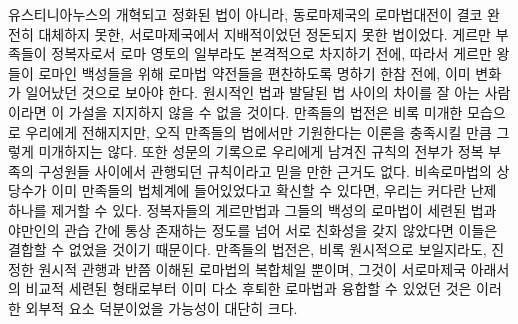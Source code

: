 유스티니아누스의 개혁되고 정화된 법이 아니라,
동로마제국의 로마법대전이 결코 완전히 대체하지 못한,
서로마제국에서 지배적이었던
정돈되지 못한 법이었다.
게르만 부족들이
정복자로서
로마 영토의 일부라도 본격적으로 차지하기 전에,
따라서 게르만 왕들이 로마인 백성들을 위해
로마법 약전들을 편찬하도록 명하기 한참 전에,
이미 변화가 일어났던 것으로 보아야 한다.
원시적인 법과 발달된 법 사이의 차이를 잘 아는 사람이라면
이 가설을 지지하지 않을 수 없을 것이다.
만족들의 법전은
비록 미개한 모습으로 우리에게 전해지지만,
오직 만족들의 법에서만 기원한다는 이론을 충족시킬 만큼
그렇게 미개하지는 않다.
또한
성문의 기록으로 우리에게 남겨진 규칙의 전부가
정복 부족의 구성원들 사이에서 관행되던 규칙이라고
믿을 만한 근거도 없다.
비속로마법의 상당수가
이미 만족들의 법체계에 들어있었다고 확신할 수 있다면,
우리는 커다란 난제 하나를 제거할 수 있다.
정복자들의 게르만법과
그들의 백성의 로마법이
세련된 법과 야만인의 관습 간에 통상 존재하는 정도를 넘어
서로 친화성을 갖지 않았다면
이들은
결합할 수 없었을 것이기 때문이다.
만족들의 법전은,
비록 원시적으로 보일지라도,
진정한 원시적 관행과 반쯤 이해된 로마법의 복합체일 뿐이며,
그것이
서로마제국 아래서의 비교적 세련된 형태로부터 이미 다소 후퇴한
로마법과 융합할 수 있었던 것은
이러한 외부적 요소 덕분이었을
가능성이 대단히 크다.

